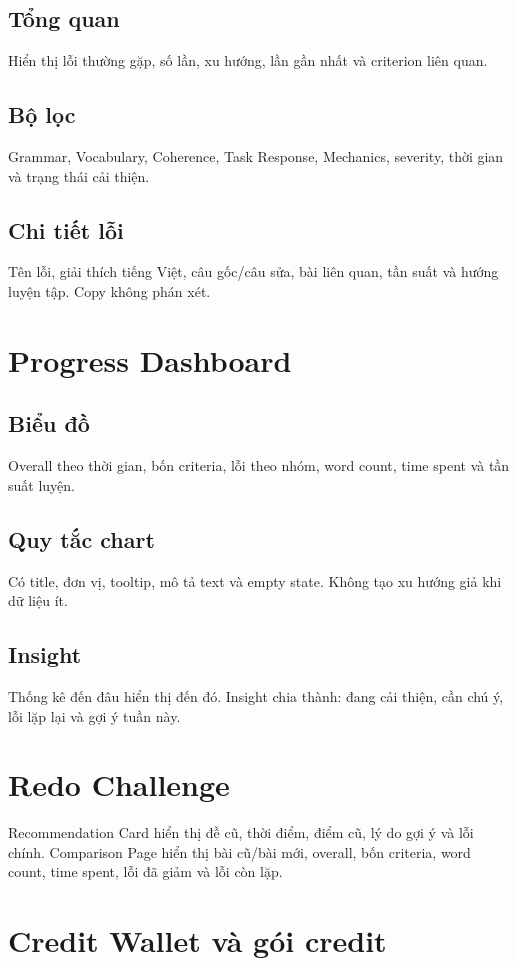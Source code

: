 \documentclass[11pt,a4paper]{article}
\begin{document}
\subsection{Tổng quan}
Hiển thị lỗi thường gặp, số lần, xu hướng, lần gần nhất và criterion liên quan.

\subsection{Bộ lọc}
Grammar, Vocabulary, Coherence, Task Response, Mechanics, severity, thời gian và trạng thái cải thiện.

\subsection{Chi tiết lỗi}
Tên lỗi, giải thích tiếng Việt, câu gốc/câu sửa, bài liên quan, tần suất và hướng luyện tập. Copy không phán xét.

\section{Progress Dashboard}

\subsection{Biểu đồ}
Overall theo thời gian, bốn criteria, lỗi theo nhóm, word count, time spent và tần suất luyện.

\subsection{Quy tắc chart}
Có title, đơn vị, tooltip, mô tả text và empty state. Không tạo xu hướng giả khi dữ liệu ít.

\subsection{Insight}
Thống kê đến đâu hiển thị đến đó. Insight chia thành: đang cải thiện, cần chú ý, lỗi lặp lại và gợi ý tuần này.

\section{Redo Challenge}
Recommendation Card hiển thị đề cũ, thời điểm, điểm cũ, lý do gợi ý và lỗi chính. Comparison Page hiển thị bài cũ/bài mới, overall, bốn criteria, word count, time spent, lỗi đã giảm và lỗi còn lặp.

\section{Credit Wallet và gói credit}
\end{document}
